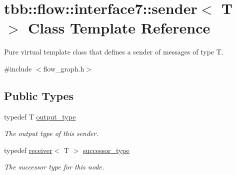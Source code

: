 \hypertarget{classtbb_1_1flow_1_1interface7_1_1sender}{}\section{tbb\+:\+:flow\+:\+:interface7\+:\+:sender$<$ T $>$ Class Template Reference}
\label{classtbb_1_1flow_1_1interface7_1_1sender}


Pure virtual template class that defines a sender of messages of type T.  




{\ttfamily \#include $<$flow\+\_\+graph.\+h$>$}

\subsection*{Public Types}
\begin{DoxyCompactItemize}
\item 
\hypertarget{classtbb_1_1flow_1_1interface7_1_1sender_add86fddf72758d8e5b05b07650c6eeed}{}typedef T \hyperlink{classtbb_1_1flow_1_1interface7_1_1sender_add86fddf72758d8e5b05b07650c6eeed}{output\+\_\+type}\label{classtbb_1_1flow_1_1interface7_1_1sender_add86fddf72758d8e5b05b07650c6eeed}

\begin{DoxyCompactList}\small\item\em The output type of this sender. \end{DoxyCompactList}\item 
\hypertarget{classtbb_1_1flow_1_1interface7_1_1sender_a7779627063a29d4d2a1fc905a5cae8db}{}typedef \hyperlink{classtbb_1_1flow_1_1interface7_1_1receiver}{receiver}$<$ T $>$ \hyperlink{classtbb_1_1flow_1_1interface7_1_1sender_a7779627063a29d4d2a1fc905a5cae8db}{successor\+\_\+type}\label{classtbb_1_1flow_1_1interface7_1_1sender_a7779627063a29d4d2a1fc905a5cae8db}

\begin{DoxyCompactList}\small\item\em The successor type for this node. \end{DoxyCompactList}\end{DoxyCompactItemize}
